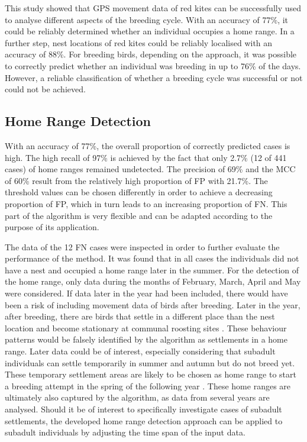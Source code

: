 This study showed that GPS movement data of red kites can be successfully used to analyse different aspects of the breeding cycle. With an accuracy of 77\%, it could be reliably determined whether an individual occupies a home range. In a further step, nest locations of red kites could be reliably localised with an accuracy of 88\%. For breeding birds, depending on the approach, it was possible to correctly predict whether an individual was breeding in up to 76\% of the days. However, a reliable classification of whether a breeding cycle was successful or not could not be achieved.

\subsection{Home Range Detection}
With an accuracy of 77\%, the overall proportion of correctly predicted cases is high. The high recall of 97\% is achieved by the fact that only 2.7\% (12 of 441 cases) of home ranges remained undetected. The precision of 69\% and the MCC of 60\% result from the relatively high proportion of FP with 21.7\%. The threshold values can be chosen differently in order to achieve a decreasing proportion of FP, which in turn leads to an increasing proportion of FN. This part of the algorithm is very flexible and can be adapted according to the purpose of its application.

The data of the 12 FN cases were inspected in order to further evaluate the performance of the method. It was found that in all cases the individuals did not have a nest and occupied a home range later in the summer. For the detection of the home range, only data during the months of February, March, April and May were considered. If data later in the year had been included, there would have been a risk of including movement data of birds after breeding. Later in the year, after breeding, there are birds that settle in a different place than the nest location and become stationary at communal roosting sites \parencite{spatz2022sex}. These behaviour patterns would be falsely identified by the algorithm as settlements in a home range. Later data could be of interest, especially considering that subadult individuals can settle temporarily in summer and autumn but do not breed yet. These temporary settlement areas are likely to be chosen as home range to start a breeding attempt in the spring of the following year \parencite{aebischer2021rotmilan}. These home ranges are ultimately also captured by the algorithm, as data from several years are analysed. Should it be of interest to specifically investigate cases of subadult settlements, the developed home range detection approach can be applied to subadult individuals by adjusting the time span of the input data.

